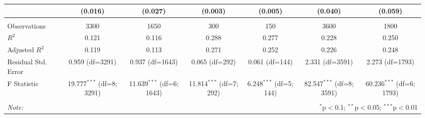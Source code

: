\begin{table}[!htbp]
\begin{tabular}{@{\extracolsep{5pt}}lcccccc}
& (0.016) & (0.027) & (0.003) & (0.005) & (0.040) & (0.059) \\
\hline \\[-1.8ex]
 Observations & 3300 & 1650 & 300 & 150 & 3600 & 1800 \\
 $R^2$ & 0.121 & 0.116 & 0.288 & 0.277 & 0.228 & 0.250 \\
 Adjusted $R^2$ & 0.119 & 0.113 & 0.271 & 0.252 & 0.226 & 0.248 \\
 Residual Std. Error & 0.959 (df=3291) & 0.937 (df=1643) & 0.065 (df=292) & 0.061 (df=144) & 2.331 (df=3591) & 2.273 (df=1793) \\
 F Statistic & 19.777$^{***}$ (df=8; 3291) & 11.639$^{***}$ (df=6; 1643) & 11.814$^{***}$ (df=7; 292) & 6.248$^{***}$ (df=5; 144) & 82.547$^{***}$ (df=8; 3591) & 60.236$^{***}$ (df=6; 1793) \\
\hline
\hline \\[-1.8ex]
\textit{Note:} & \multicolumn{6}{r}{$^{*}$p$<$0.1; $^{**}$p$<$0.05; $^{***}$p$<$0.01} \\
\end{tabular}
\end{table}